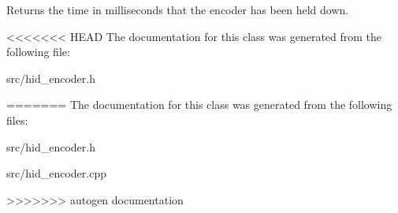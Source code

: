 Returns the time in milliseconds that the encoder has been held down. 

<<<<<<< HEAD
The documentation for this class was generated from the following file\+:\begin{DoxyCompactItemize}
\item 
src/hid\+\_\+encoder.\+h\end{DoxyCompactItemize}
=======
The documentation for this class was generated from the following files\+:\begin{DoxyCompactItemize}
\item 
src/hid\+\_\+encoder.\+h\item 
src/hid\+\_\+encoder.\+cpp\end{DoxyCompactItemize}
>>>>>>> autogen documentation
